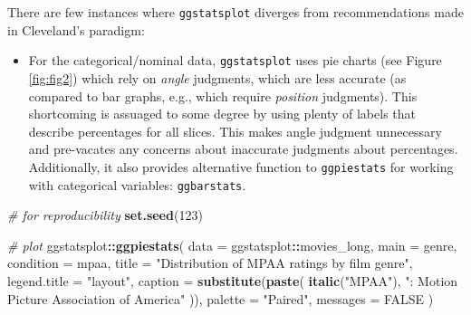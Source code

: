 \documentclass[]{article}
\newenvironment{Shaded}{\begin{snugshade}}{\end{snugshade}}
\newcommand{\CommentTok}[1]{\textcolor[rgb]{0.56,0.35,0.01}{\textit{#1}}}
\newcommand{\DataTypeTok}[1]{\textcolor[rgb]{0.13,0.29,0.53}{#1}}
\newcommand{\DecValTok}[1]{\textcolor[rgb]{0.00,0.00,0.81}{#1}}
\newcommand{\KeywordTok}[1]{\textcolor[rgb]{0.13,0.29,0.53}{\textbf{#1}}}
\newcommand{\NormalTok}[1]{#1}
\newcommand{\OperatorTok}[1]{\textcolor[rgb]{0.81,0.36,0.00}{\textbf{#1}}}
\newcommand{\OtherTok}[1]{\textcolor[rgb]{0.56,0.35,0.01}{#1}}
\newcommand{\StringTok}[1]{\textcolor[rgb]{0.31,0.60,0.02}{#1}}
\providecommand{\tightlist}{%
  \setlength{\itemsep}{0pt}\setlength{\parskip}{0pt}}
\begin{document}
There are few instances where \texttt{ggstatsplot} diverges from recommendations made
in Cleveland's paradigm:

\begin{itemize}
\tightlist
\item
  For the categorical/nominal data, \texttt{ggstatsplot} uses pie charts (see Figure
  \ref{fig:fig2}) which rely on \emph{angle} judgments, which are less accurate (as
  compared to bar graphs, e.g., which require \emph{position} judgments). This
  shortcoming is assuaged to some degree by using plenty of labels that
  describe percentages for all slices. This makes angle judgment unnecessary
  and pre-vacates any concerns about inaccurate judgments about percentages.
  Additionally, it also provides alternative function to \texttt{ggpiestats} for
  working with categorical variables: \texttt{ggbarstats}.
\end{itemize}

\begin{Shaded}
\begin{Highlighting}[]
\CommentTok{# for reproducibility}
\KeywordTok{set.seed}\NormalTok{(}\DecValTok{123}\NormalTok{)}

\CommentTok{# plot}
\NormalTok{ggstatsplot}\OperatorTok{::}\KeywordTok{ggpiestats}\NormalTok{(}
  \DataTypeTok{data =}\NormalTok{ ggstatsplot}\OperatorTok{::}\NormalTok{movies_long,}
  \DataTypeTok{main =}\NormalTok{ genre,}
  \DataTypeTok{condition =}\NormalTok{ mpaa,}
  \DataTypeTok{title =} \StringTok{"Distribution of MPAA ratings by film genre"}\NormalTok{,}
  \DataTypeTok{legend.title =} \StringTok{"layout"}\NormalTok{,}
  \DataTypeTok{caption =} \KeywordTok{substitute}\NormalTok{(}\KeywordTok{paste}\NormalTok{(}
    \KeywordTok{italic}\NormalTok{(}\StringTok{"MPAA"}\NormalTok{), }\StringTok{": Motion Picture Association of America"}
\NormalTok{  )),}
  \DataTypeTok{palette =} \StringTok{"Paired"}\NormalTok{,}
  \DataTypeTok{messages =} \OtherTok{FALSE}
\NormalTok{)}
\end{Highlighting}
\end{Shaded}
\end{document}

